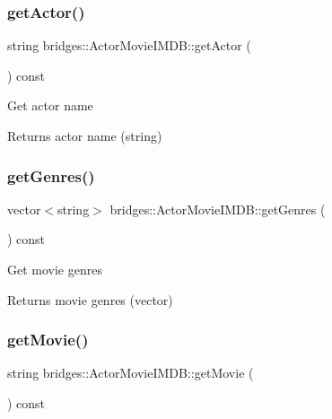 \subsubsection{\texorpdfstring{get\+Actor()}{getActor()}}
{\footnotesize\ttfamily string bridges\+::\+Actor\+Movie\+I\+M\+D\+B\+::get\+Actor (\begin{DoxyParamCaption}{ }\end{DoxyParamCaption}) const\hspace{0.3cm}{\ttfamily [inline]}}

Get actor name

\begin{DoxyReturn}{Returns}
actor name (string) 
\end{DoxyReturn}
\mbox{\label{classbridges_1_1_actor_movie_i_m_d_b_a743646c44f7386901accdb12cbce88c2}} 
\subsubsection{\texorpdfstring{get\+Genres()}{getGenres()}}
{\footnotesize\ttfamily vector$<$string$>$ bridges\+::\+Actor\+Movie\+I\+M\+D\+B\+::get\+Genres (\begin{DoxyParamCaption}{ }\end{DoxyParamCaption}) const\hspace{0.3cm}{\ttfamily [inline]}}

Get movie genres

\begin{DoxyReturn}{Returns}
movie genres (vector) 
\end{DoxyReturn}
\mbox{\label{classbridges_1_1_actor_movie_i_m_d_b_ab0c6e7d290dfe9d847cf3193323c158d}} 
\subsubsection{\texorpdfstring{get\+Movie()}{getMovie()}}
{\footnotesize\ttfamily string bridges\+::\+Actor\+Movie\+I\+M\+D\+B\+::get\+Movie (\begin{DoxyParamCaption}{ }\end{DoxyParamCaption}) const\hspace{0.3cm}{\ttfamily [inline]}}

